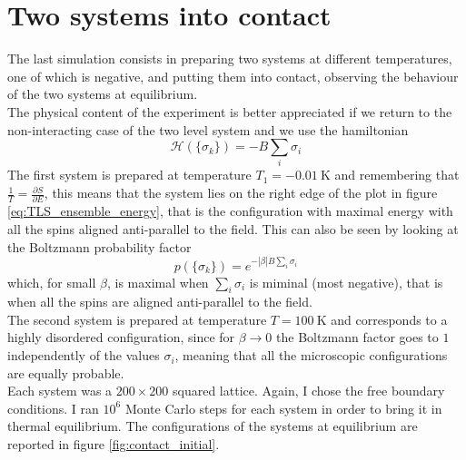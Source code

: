 \section{Two systems into contact}
The last simulation consists in preparing two systems at different temperatures, one of which is negative, and putting them into contact, observing the behaviour of the two systems at equilibrium. \\
The physical content of the experiment is better appreciated if we return to the non-interacting case of the two level system and we use the hamiltonian
\begin{equation*}
    \mathcal{H}(\{\sigma_k\}) = -B \sum_i \sigma_i
\end{equation*}
The first system is prepared at temperature $T_1 = \SI{-0.01}{\kelvin}$ and remembering that $\frac{1}{T} = \frac{\partial S}{\partial E}$, this means that the system lies on the right edge of the plot in figure \ref{eq:TLS_ensemble_energy}, that is the configuration with maximal energy with all the spins aligned anti-parallel to the field. This can 
also be seen by looking at the Boltzmann probability factor 
\begin{equation*}
    p(\{\sigma_k\}) = e^{-|\beta| B \sum_i \sigma_i}
\end{equation*}
which, for small $\beta$, is maximal when $\sum_i \sigma_i$ is miminal (most negative), that is when all the spins are aligned anti-parallel to the field. \\
The second system is prepared at temperature $T=\SI{100}{\kelvin}$ and corresponds to a highly disordered configuration, since for $\beta \to 0$ the Boltzmann factor goes to $1$ independently of the values $\sigma_i$, meaning that all the microscopic configurations are equally probable. \\
Each system was a $200 \times 200$ squared lattice. Again, I chose the free boundary conditions. I ran $10^6$ Monte Carlo steps for each system in order to bring it in thermal equilibrium. The configurations of the systems at equilibrium are reported in figure \ref{fig:contact_initial}. \par
